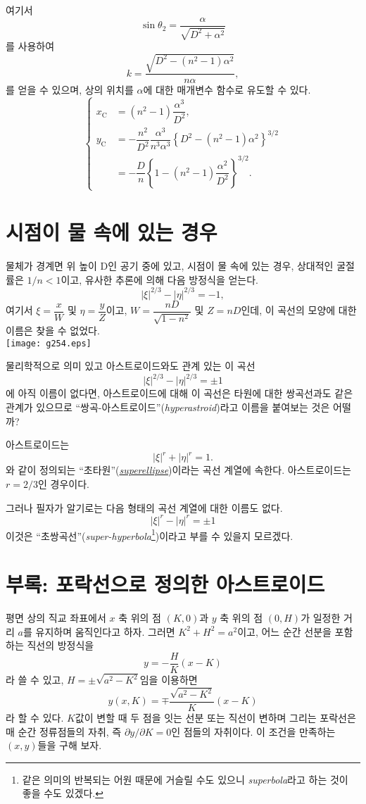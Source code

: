 \documentclass[twocolumn]{article}
\begin{document}
여기서
	$$\sin\theta_2 = \dfrac{\alpha}{\sqrt{D^2+\alpha^2}}$$
를 사용하여
	$$k = \dfrac{\sqrt{D^2-(n^2-1)\alpha^2}}{n\alpha},$$
	를 얻을 수 있으며, 
	상의 위치를 $\alpha$에 대한 매개변수 함수로 유도할 수 있다.
	$$ \left\{ 
	\begin{aligned}
		x_{\mathrm{C}}^{} &= (n^2-1)\dfrac{\alpha^3}{D^2},\\
		y_{\mathrm{C}}^{} &= -\dfrac{n^2}{D^2}\dfrac{\alpha^3}
		{n^3\alpha^3}\left\{ D^2-(n^2-1)\alpha^2 \right\}^{3/2}\\
		&=-\dfrac{D}{n}\left\{ 1-(n^2-1)\dfrac{\alpha^2}{D^2} \right\}^{3/2}.
	\end{aligned}
	\right.$$
	
\section{시점이 물 속에 있는 경우}

물체가 경계면 위 높이 D인 공기 중에 있고, 
시점이 물 속에 있는 경우, 상대적인 굴절률은 $1/n < 1$이고, 
유사한 추론에 의해 다음 방정식을 얻는다.
$$ \left| \xi \right|^{2/3} - \left| \eta \right|^{2/3} = -1, $$
여기서 $\xi = \dfrac{x}{W} $ 및 $\eta = \dfrac{y}{Z}$이고, 
$W = \dfrac{nD}{\sqrt{1-n^2}}$ 및 $Z = nD$인데,  
이 곡선의 모양에 대한 이름은 찾을 수 없었다. \\


\texttt{[image: g254.eps]}

물리학적으로 의미 있고 아스트로이드와도 관계 있는 이 곡선
$$ \left| \xi \right|^{2/3} - \left| \eta \right|^{2/3} = \pm1 $$
에 아직 이름이 없다면, 아스트로이드에 대해 이 곡선은 타원에 대한 쌍곡선과도 같은 관계가 있으므로 
``쌍곡-아스트로이드''(\emph{hyperastroid})라고 이름을 붙여보는 것은 어떨까?

아스트로이드는 
$$ \left| \xi \right|^{r} + \left| \eta \right|^{r} = 1. $$
와 같이 정의되는 ``초타원''(\href{https://mathworld.wolfram.com/Astroid.html}%
{\emph{superellipse}})이라는 곡선 계열에 속한다. 
아스트로이드는 $r=2/3$인 경우이다.
 
그러나 필자가 알기로는 다음 형태의 곡선 계열에 대한 이름도 없다.
$$ \left| \xi \right|^{r} - \left| \eta \right|^{r} = \pm 1 $$
이것은 ``초쌍곡선''(\emph{super-hyperbola}\footnote{같은 의미의 반복되는 어원
때문에 거슬릴 수도 있으니 \emph{superbola}라고 하는 것이 
좋을 수도 있겠다.})이라고 부를 수 있을지 모르겠다.

\appendix
\section*{부록: 포락선으로 정의한 아스트로이드}
평면 상의 직교 좌표에서 $x$ 축 위의 점  $(K, 0)$과 $y$ 축 위의 점 $(0, H)$가 일정한 거리 $a$를 유지하며 움직인다고 하자. 그러면 $K^2+H^2=a^2$이고, 어느 순간 선분을 포함하는 직선의 방정식을 
$$y=-\dfrac{H}{K}(x-K)$$
라 쓸 수 있고, $H=\pm \sqrt{a^2-K^2}$임을 이용하면 
$$y(x, K) = \mp \dfrac{\sqrt{a^2-K^2}}{K}(x-K)$$
라 할 수 있다. 
$K$값이 변할 때 두 점을 잇는 선분 또는 직선이 변하며 그리는 포락선은 매 순간 정류점들의 자취, 즉
\newcommand{\pardiff}[2]{{\frac{\partial #1}{\partial #2}}}
\newcommand{\ilpardiff}[2]{{{\partial #1}/{\partial #2}}}
$\ilpardiff{y}{K} = 0$인 점들의 자취이다. 이 조건을 만족하는 $(x, y)$들을 구해 보자.
\end{document}

